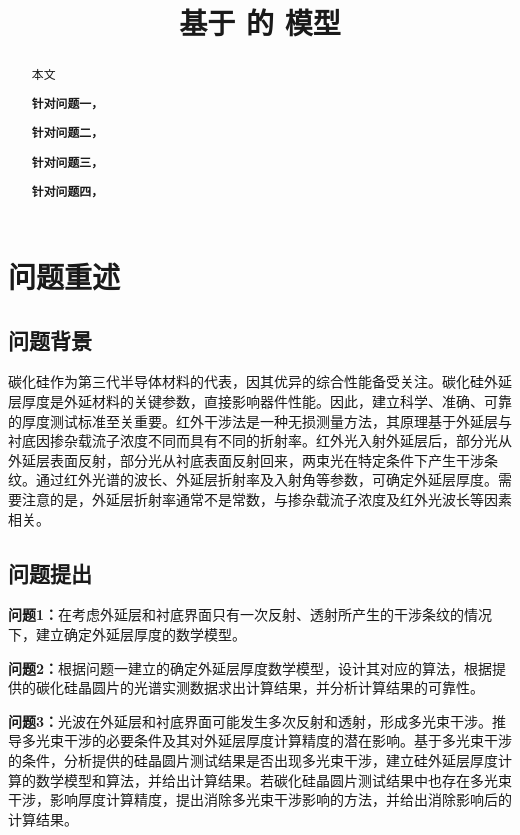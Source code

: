 \documentclass[withoutpreface,bwprint]{cumcmthesis} %
\title{基于 的 模型}
\begin{document}
\maketitle
\nocite{*}


\begin{abstract}
本文

    \textbf{针对问题一，}

    \textbf{针对问题二，}

    \textbf{针对问题三，}

    \textbf{针对问题四，}

\end{abstract}

\section{问题重述}

\subsection{问题背景}
碳化硅作为第三代半导体材料的代表，因其优异的综合性能备受关注。碳化硅外延层厚度是外延材料的关键参数，直接影响器件性能。因此，建立科学、准确、可靠的厚度测试标准至关重要。红外干涉法是一种无损测量方法，其原理基于外延层与衬底因掺杂载流子浓度不同而具有不同的折射率。红外光入射外延层后，部分光从外延层表面反射，部分光从衬底表面反射回来，两束光在特定条件下产生干涉条纹。通过红外光谱的波长、外延层折射率及入射角等参数，可确定外延层厚度。需要注意的是，外延层折射率通常不是常数，与掺杂载流子浓度及红外光波长等因素相关。

\subsection{问题提出}

\textbf{问题1：}在考虑外延层和衬底界面只有一次反射、透射所产生的干涉条纹的情况下，建立确定外延层厚度的数学模型。

\textbf{问题2：}根据问题一建立的确定外延层厚度数学模型，设计其对应的算法，根据提供的碳化硅晶圆片的光谱实测数据求出计算结果，并分析计算结果的可靠性。

\textbf{问题3：}光波在外延层和衬底界面可能发生多次反射和透射，形成多光束干涉。推导多光束干涉的必要条件及其对外延层厚度计算精度的潜在影响。基于多光束干涉的条件，分析提供的硅晶圆片测试结果是否出现多光束干涉，建立硅外延层厚度计算的数学模型和算法，并给出计算结果。若碳化硅晶圆片测试结果中也存在多光束干涉，影响厚度计算精度，提出消除多光束干涉影响的方法，并给出消除影响后的计算结果。
\end{document}

